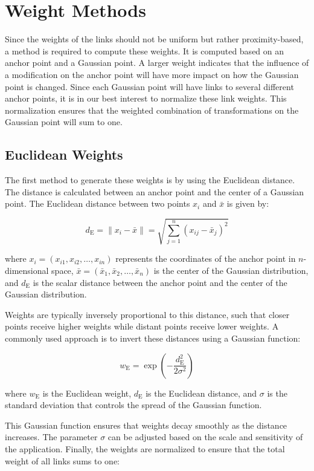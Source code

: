 \section{Weight Methods}

Since the weights of the links should not be uniform but rather proximity-based, a method is required to compute these weights. It is computed based on an anchor point and a Gaussian point. A larger weight indicates that the influence of a modification on the anchor point will have more impact on how the Gaussian point is changed. Since each Gaussian point will have links to several different anchor points, it is in our best interest to normalize these link weights. This normalization ensures that the weighted combination of transformations on the Gaussian point will sum to one.

\subsection{Euclidean Weights}

The first method to generate these weights is by using the Euclidean distance. The distance is calculated between an anchor point and the center of a Gaussian point. The Euclidean distance between two points \(x_i\) and \(\bar{x}\) is given by:

\[
d_{\text{E}} = \|x_i - \bar{x}\| = \sqrt{\sum_{j=1}^n (x_{ij} - \bar{x}_j)^2}
\]

where \(x_i = (x_{i1}, x_{i2}, \dots, x_{in})\) represents the coordinates of the anchor point in \(n\)-dimensional space, \(\bar{x} = (\bar{x}_1, \bar{x}_2, \dots, \bar{x}_n)\) is the center of the Gaussian distribution, and \(d_{\text{E}}\) is the scalar distance between the anchor point and the center of the Gaussian distribution.

Weights are typically inversely proportional to this distance, such that closer points receive higher weights while distant points receive lower weights. A commonly used approach is to invert these distances using a Gaussian function:

\[
w_{\text{E}} = \exp\left(-\frac{d_{\text{E}}^2}{2\sigma^2}\right)
\]

where \(w_{\text{E}}\) is the Euclidean weight, \(d_{\text{E}}\) is the Euclidean distance, and \(\sigma\) is the standard deviation that controls the spread of the Gaussian function.

This Gaussian function ensures that weights decay smoothly as the distance increases. The parameter \(\sigma\) can be adjusted based on the scale and sensitivity of the application. Finally, the weights are normalized to ensure that the total weight of all links sums to one:

